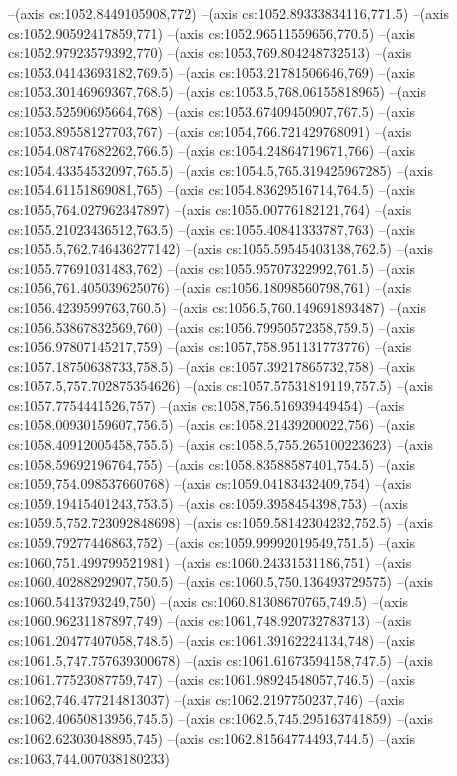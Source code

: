 --(axis cs:1052.8449105908,772)
--(axis cs:1052.89333834116,771.5)
--(axis cs:1052.90592417859,771)
--(axis cs:1052.96511559656,770.5)
--(axis cs:1052.97923579392,770)
--(axis cs:1053,769.804248732513)
--(axis cs:1053.04143693182,769.5)
--(axis cs:1053.21781506646,769)
--(axis cs:1053.30146969367,768.5)
--(axis cs:1053.5,768.06155818965)
--(axis cs:1053.52590695664,768)
--(axis cs:1053.67409450907,767.5)
--(axis cs:1053.89558127703,767)
--(axis cs:1054,766.721429768091)
--(axis cs:1054.08747682262,766.5)
--(axis cs:1054.24864719671,766)
--(axis cs:1054.43354532097,765.5)
--(axis cs:1054.5,765.319425967285)
--(axis cs:1054.61151869081,765)
--(axis cs:1054.83629516714,764.5)
--(axis cs:1055,764.027962347897)
--(axis cs:1055.00776182121,764)
--(axis cs:1055.21023436512,763.5)
--(axis cs:1055.40841333787,763)
--(axis cs:1055.5,762.746436277142)
--(axis cs:1055.59545403138,762.5)
--(axis cs:1055.77691031483,762)
--(axis cs:1055.95707322992,761.5)
--(axis cs:1056,761.405039625076)
--(axis cs:1056.18098560798,761)
--(axis cs:1056.4239599763,760.5)
--(axis cs:1056.5,760.149691893487)
--(axis cs:1056.53867832569,760)
--(axis cs:1056.79950572358,759.5)
--(axis cs:1056.97807145217,759)
--(axis cs:1057,758.951131773776)
--(axis cs:1057.18750638733,758.5)
--(axis cs:1057.39217865732,758)
--(axis cs:1057.5,757.702875354626)
--(axis cs:1057.57531819119,757.5)
--(axis cs:1057.7754441526,757)
--(axis cs:1058,756.516939449454)
--(axis cs:1058.00930159607,756.5)
--(axis cs:1058.21439200022,756)
--(axis cs:1058.40912005458,755.5)
--(axis cs:1058.5,755.265100223623)
--(axis cs:1058.59692196764,755)
--(axis cs:1058.83588587401,754.5)
--(axis cs:1059,754.098537660768)
--(axis cs:1059.04183432409,754)
--(axis cs:1059.19415401243,753.5)
--(axis cs:1059.3958454398,753)
--(axis cs:1059.5,752.723092848698)
--(axis cs:1059.58142304232,752.5)
--(axis cs:1059.79277446863,752)
--(axis cs:1059.99992019549,751.5)
--(axis cs:1060,751.499799521981)
--(axis cs:1060.24331531186,751)
--(axis cs:1060.40288292907,750.5)
--(axis cs:1060.5,750.136493729575)
--(axis cs:1060.5413793249,750)
--(axis cs:1060.81308670765,749.5)
--(axis cs:1060.96231187897,749)
--(axis cs:1061,748.920732783713)
--(axis cs:1061.20477407058,748.5)
--(axis cs:1061.39162224134,748)
--(axis cs:1061.5,747.757639300678)
--(axis cs:1061.61673594158,747.5)
--(axis cs:1061.77523087759,747)
--(axis cs:1061.98924548057,746.5)
--(axis cs:1062,746.477214813037)
--(axis cs:1062.2197750237,746)
--(axis cs:1062.40650813956,745.5)
--(axis cs:1062.5,745.295163741859)
--(axis cs:1062.62303048895,745)
--(axis cs:1062.81564774493,744.5)
--(axis cs:1063,744.007038180233)
